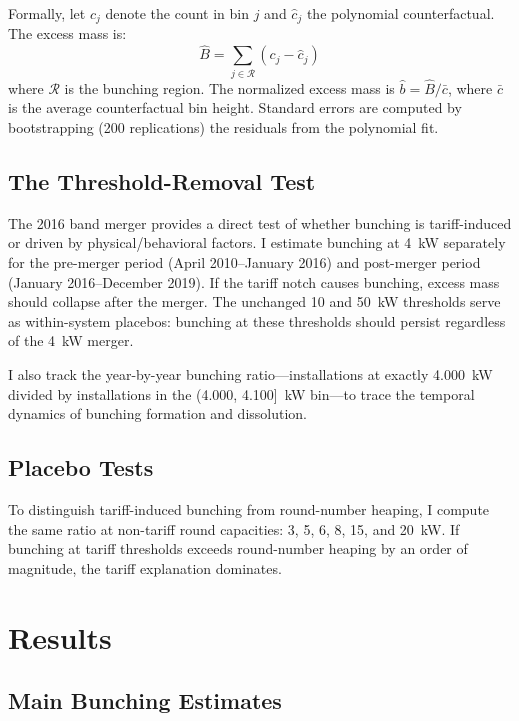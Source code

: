 \documentclass[12pt]{article}
\begin{document}
Formally, let $c_j$ denote the count in bin $j$ and $\hat{c}_j$ the polynomial counterfactual. The excess mass is:
\begin{equation}
  \hat{B} = \sum_{j \in \mathcal{R}} (c_j - \hat{c}_j)
\end{equation}
where $\mathcal{R}$ is the bunching region. The normalized excess mass is $\hat{b} = \hat{B} / \bar{c}$, where $\bar{c}$ is the average counterfactual bin height. Standard errors are computed by bootstrapping (200 replications) the residuals from the polynomial fit.

\subsection{The Threshold-Removal Test}

The 2016 band merger provides a direct test of whether bunching is tariff-induced or driven by physical/behavioral factors. I estimate bunching at 4~kW separately for the pre-merger period (April 2010--January 2016) and post-merger period (January 2016--December 2019). If the tariff notch causes bunching, excess mass should collapse after the merger. The unchanged 10 and 50~kW thresholds serve as within-system placebos: bunching at these thresholds should persist regardless of the 4~kW merger.

I also track the year-by-year bunching ratio---installations at exactly 4.000~kW divided by installations in the (4.000, 4.100]~kW bin---to trace the temporal dynamics of bunching formation and dissolution.

\subsection{Placebo Tests}

To distinguish tariff-induced bunching from round-number heaping, I compute the same ratio at non-tariff round capacities: 3, 5, 6, 8, 15, and 20~kW. If bunching at tariff thresholds exceeds round-number heaping by an order of magnitude, the tariff explanation dominates.


\section{Results}
\label{sec:results}

\subsection{Main Bunching Estimates}
\end{document}
